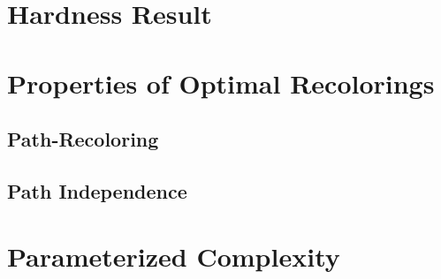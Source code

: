 

\section{Hardness Result}



\section{Properties of Optimal Recolorings}


	\subsection{Path-Recoloring}
	

	\subsection{Path Independence}
	




\section{Parameterized Complexity}
